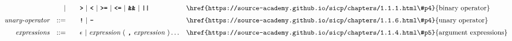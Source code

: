 \begin{alignat*}{9}
&&                       && |  &\quad &&  \texttt{\textbf{>}}\ |\ \texttt{\textbf{<}}\ |\ \texttt{\textbf{>=}}\ |\ \texttt{\textbf{<=}}\
                                          |\ \textbf{\texttt{\&\&}}\ |\ \texttt{\textbf{||}}
                                          && \textrm{\href{https://source-academy.github.io/sicp/chapters/1.1.1.html\#p4}{binary operator}}\\[1mm]
&& \textit{unary-operator}    
                        && ::= &\quad && \textbf{\texttt{!}}\ |\ \textbf{\texttt{-}}
                        && \textrm{\href{https://source-academy.github.io/sicp/chapters/1.1.6.html\#p4}{unary operator}}\\[1mm]                        
&& \textit{expressions}  && ::= &\quad && \epsilon\ | \ \textit{expression}\ (
                                                               \ \textbf{\texttt{,}} \
                                                                 \textit{expression} \ 
                                                                      ) \ldots
                                                            && \textrm{\href{https://source-academy.github.io/sicp/chapters/1.1.4.html\#p5}{argument expressions}}
\end{alignat*}
